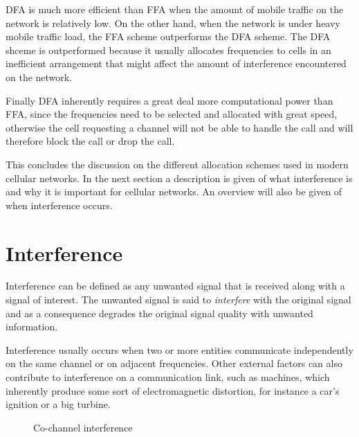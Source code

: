 \gls{DFA} is much more efficient than \gls{FFA} when the amount of mobile traffic on the network is relatively low\cite{PrinciplesMobileCommunication,WirelessCommunications}. On the other hand, when the network is under heavy mobile traffic load, the \gls{FFA} scheme outperforms the \gls{DFA} scheme\cite{WirelessCommunications}. The \gls{DFA} shceme is outperformed because it usually allocates frequencies to cells in an inefficient arrangement that might affect the amount of interference encountered on the network\cite{MobileWirelessCommunications}.

Finally \gls{DFA} inherently requires a great deal more computational power than \gls{FFA}, since the frequencies need to be selected and allocated with great speed, otherwise the cell requesting a channel will not be able to handle the call and will therefore block the call or drop the call\cite{PrinciplesMobileCommunication,WirelessCommunications,MobileWirelessCommunications}.


This concludes the discussion on the different allocation schemes used in modern cellular networks. In the next section a description is given of what interference is and why it is important for cellular networks. An overview will also be given of when interference occurs.

\section{Interference}
\label{sec:Interference}
Interference can be defined as any unwanted signal that is received along with a signal of interest. The unwanted signal is said to \emph{interfere} with the original signal and as a consequence degrades the original signal quality with unwanted information\cite{WirelessDigitalCommunications}.

Interference usually occurs when two or more entities communicate independently on the same channel or on adjacent frequencies\cite{WirelessCommunications,WirelessDigitalCommunications}. Other external factors can also contribute to interference on a communication link, such as machines, which inherently produce some sort of electromagnetic distortion, for instance a car's ignition or a big turbine\cite{WirelessCommunications,WirelessDigitalCommunications}. 
\begin{figure}[t!]
	\begin{centering}
	
	\label{fig:sameinterference}
	\caption{Co-channel interference}
	\end{centering}
\end{figure}

